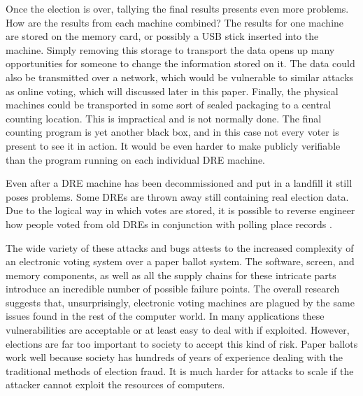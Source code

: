 \documentclass[12pt, titlepage]{article}
\begin{document}
Once the election is over, tallying the final results presents even more problems. How are the results from each machine combined? The results for one machine are stored on the memory card, or possibly a USB stick inserted into the machine. Simply removing this storage to transport the data opens up many opportunities for someone to change the information stored on it. The data could also be transmitted over a network, which would be vulnerable to similar attacks as online voting, which will discussed later in this paper. Finally, the physical machines could be transported in some sort of sealed packaging to a central counting location. This is impractical and is not normally done. The final counting program is yet another black box, and in this case not every voter is present to see it in action. It would be even harder to make publicly verifiable than the program running on each individual DRE machine.

Even after a DRE machine has been decommissioned and put in a landfill it still poses problems. Some DREs are thrown away still containing real election data. Due to the logical way in which votes are stored, it is possible to reverse engineer how people voted from old DREs in conjunction with polling place records \cite{hao2016real}.

The wide variety of these attacks and bugs attests to the increased complexity of an electronic voting system over a paper ballot system. The software, screen, and memory components, as well as all the supply chains for these intricate parts introduce an incredible number of possible failure points. The overall research suggests that, unsurprisingly, electronic voting machines are plagued by the same issues found in the rest of the computer world. In many applications these vulnerabilities are acceptable or at least easy to deal with if exploited. However, elections are far too important to society to accept this kind of risk. Paper ballots work well because society has hundreds of years of experience dealing with the traditional methods of election fraud. It is much harder for attacks to scale if the attacker cannot exploit the resources of computers.
\end{document}
